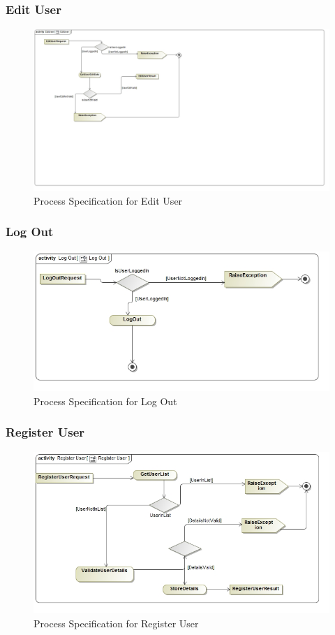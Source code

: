 \documentclass[a4paper,10pt]{article}
\begin{document}
\subsubsection{Edit User}
	\begin{figure}[H]
	\includegraphics[scale=0.5]{ActEditUser}
	\caption{Process Specification for Edit User}
	\end{figure}
		
\subsubsection{Log Out}
	\begin{figure}[H]
	\includegraphics[scale=0.5]{ActLogOut}
	\caption{Process Specification for Log Out}
	\end{figure}
		
\subsubsection{Register User}
	\begin{figure}[H]
	\includegraphics[scale=0.5]{ActRegisterUser}
	\caption{Process Specification for Register User}
	\end{figure}
		
\end{document}
